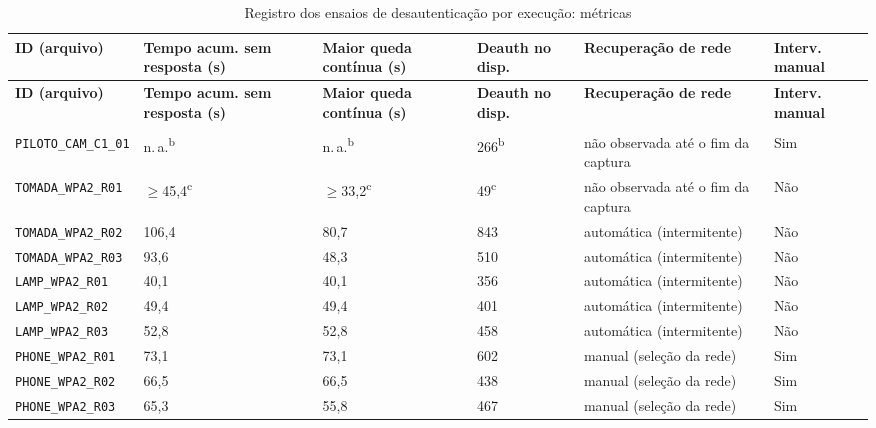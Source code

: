 \begin{longtable}{|L{2.8cm}|L{2.2cm}|L{2.2cm}|L{1.9cm}|L{3.4cm}|L{1.8cm}|}
\caption{Registro dos ensaios de desautenticação por execução: métricas}
\label{tab:registro-metricas}\\
\hline
\textbf{ID (arquivo)} & \textbf{Tempo acum. sem resposta (s)} & \textbf{Maior queda contínua (s)} & \textbf{Deauth no disp.} & \textbf{Recuperação de rede} & \textbf{Interv. manual} \\ \hline
\endfirsthead
\textbf{ID (arquivo)} & \textbf{Tempo acum. sem resposta (s)} & \textbf{Maior queda contínua (s)} & \textbf{Deauth no disp.} & \textbf{Recuperação de rede} & \textbf{Interv. manual} \\ \hline
\endhead
\hline
\endfoot
\hline
\endlastfoot
{} \\ \hline
\texttt{PILOTO\_\allowbreak{}CAM\_\allowbreak{}C1\_\allowbreak{}01} & n.\,a.\textsuperscript{b} & n.\,a.\textsuperscript{b} & 266\textsuperscript{b} & não observada até o fim da captura & Sim \\ \hline
\texttt{TOMADA\_\allowbreak{}WPA2\_\allowbreak{}R01} & $\geq$45,4\textsuperscript{c} & $\geq$33,2\textsuperscript{c} & 49\textsuperscript{c} & não observada até o fim da captura & Não \\ \hline
\texttt{TOMADA\_\allowbreak{}WPA2\_\allowbreak{}R02} & 106,4 & 80,7 & 843 & automática (intermitente) & Não \\ \hline
\texttt{TOMADA\_\allowbreak{}WPA2\_\allowbreak{}R03} & 93,6 & 48,3 & 510 & automática (intermitente) & Não \\ \hline
\texttt{LAMP\_\allowbreak{}WPA2\_\allowbreak{}R01} & 40,1 & 40,1 & 356 & automática (intermitente) & Não \\ \hline
\texttt{LAMP\_\allowbreak{}WPA2\_\allowbreak{}R02} & 49,4 & 49,4 & 401 & automática (intermitente) & Não \\ \hline
\texttt{LAMP\_\allowbreak{}WPA2\_\allowbreak{}R03} & 52,8 & 52,8 & 458 & automática (intermitente) & Não \\ \hline
\texttt{PHONE\_\allowbreak{}WPA2\_\allowbreak{}R01} & 73,1 & 73,1 & 602 & manual (seleção da rede) & Sim \\ \hline
\texttt{PHONE\_\allowbreak{}WPA2\_\allowbreak{}R02} & 66,5 & 66,5 & 438 & manual (seleção da rede) & Sim \\ \hline
\texttt{PHONE\_\allowbreak{}WPA2\_\allowbreak{}R03} & 65,3 & 55,8 & 467 & manual (seleção da rede) & Sim \\ \hline

\end{longtable}
